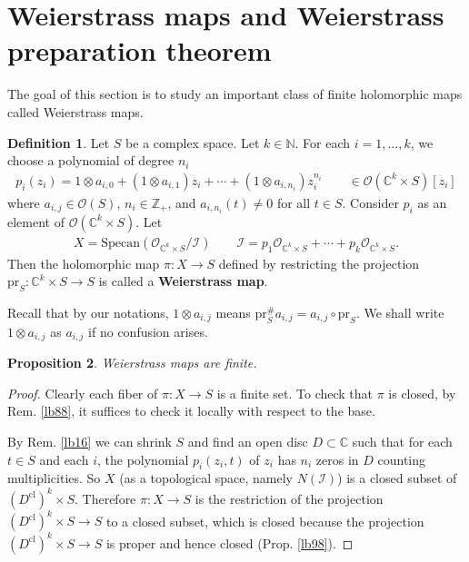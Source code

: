 \documentclass[12pt,b5paper,notitlepage]{report}
\theoremstyle{definition}
\newtheorem{df}{Definition}[section]
\theoremstyle{plain}
\newtheorem{pp}[df]{Proposition}
\newcommand{\mc}{\mathcal}
\newcommand{\scr}{\mathscr}
\newcommand{\Cbb}{\mathbb C}
\newcommand{\Nbb}{\mathbb N}
\newcommand{\Zbb}{\mathbb Z}
\newcommand{\pr}{\mathrm {pr}}
\newcommand{\cl}{\mathrm{cl}}
\newcommand{\Specan}{\mathrm{Specan}}
\numberwithin{equation}{section}
\begin{document}
\section{Weierstrass maps and Weierstrass preparation theorem}


The goal of this section is to study an important class of finite holomorphic maps called Weierstrass maps. 




\begin{df}\label{lb57}
Let $S$ be a complex space. Let $k\in\Nbb$. For each $i=1,\dots,k$, we choose a polynomial of degree $n_i$
\begin{align*}
p_i(z_i)=1\otimes a_{i,0}+(1\otimes a_{i,1})z_i+\cdots +(1\otimes a_{i,n_i})z_i^{n_i}\qquad\in \scr O(\Cbb^k\times S)[z_i]
\end{align*}
where $a_{i,j}\in\scr O(S)$, $n_i\in\Zbb_+$, and $a_{i,n_i}(t)\neq 0$ for all $t\in S$. Consider $p_i$ as an element of $\scr O(\Cbb^k\times S)$. Let
\begin{gather}
X=\Specan(\scr O_{\Cbb^k\times S}/\mc I)\qquad \mc I=p_1\scr O_{\Cbb^k\times S}+\cdots+p_k\scr O_{\Cbb^k\times S}.
\end{gather}
Then the holomorphic map $\pi:X\rightarrow S$ defined by restricting the projection $\pr_S:\Cbb^k\times S\rightarrow S$ is called a \textbf{Weierstrass map}.
\end{df}

Recall that by our notations, $1\otimes a_{i,j}$ means $\pr_S^\# a_{i,j}=a_{i,j}\circ\pr_S$. We shall write $1\otimes a_{i,j}$ as $a_{i,j}$ if no confusion arises.


\begin{pp}
Weierstrass maps are finite.
\end{pp}

\begin{proof}
Clearly each fiber of $\pi:X\rightarrow S$ is a finite set. To check that $\pi$ is closed, by Rem. \ref{lb88}, it suffices to check it locally with respect to the base.

By Rem. \ref{lb16} we can shrink $S$ and find an open disc $D\subset\Cbb$ such that for each $t\in S$ and each $i$, the polynomial $p_i(z_i,t)$ of $z_i$ has $n_i$ zeros in $D$ counting multiplicities. So $X$ (as a topological space, namely $N(\mc I)$) is a closed subset of $(D^\cl)^k\times S$. Therefore $\pi:X\rightarrow S$ is the restriction of the projection $(D^\cl)^k\times S\rightarrow S$ to a closed subset, which is closed because the projection $(D^\cl)^k\times S\rightarrow S$ is proper and hence closed (Prop. \ref{lb98}).
\end{proof}
\end{document}
